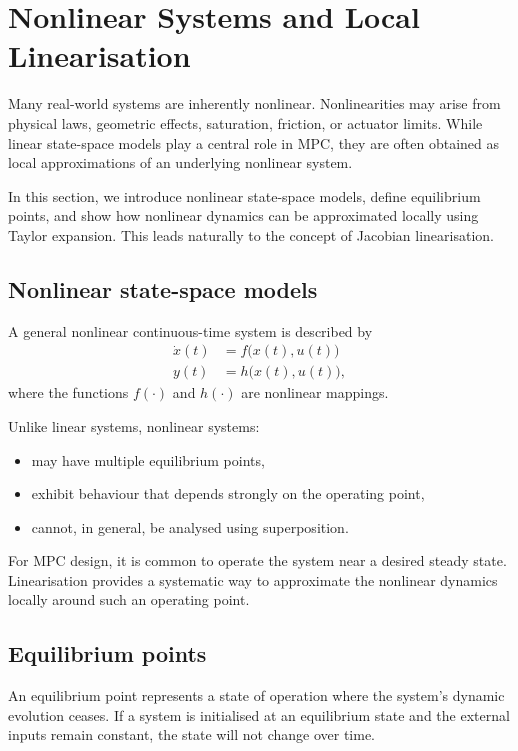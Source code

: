 \section{Nonlinear Systems and Local Linearisation}

Many real-world systems are inherently nonlinear. Nonlinearities may arise from physical laws, geometric effects, saturation, friction, or actuator limits. While linear state-space models play a central role in MPC, they are often obtained as local approximations of an underlying nonlinear system.

In this section, we introduce nonlinear state-space models, define equilibrium points, and show how nonlinear dynamics can be approximated locally using Taylor expansion. This leads naturally to the concept of Jacobian linearisation.

\subsection{Nonlinear state-space models}

A general nonlinear continuous-time system is described by
\begin{align*}
\dot{x}(t) &= f\big(x(t), u(t)\big) \\
y(t) &= h\big(x(t), u(t)\big),
\end{align*}
where the functions $f(\cdot)$ and $h(\cdot)$ are nonlinear mappings.

Unlike linear systems, nonlinear systems:
\begin{itemize}
	\item may have multiple equilibrium points,
	\item exhibit behaviour that depends strongly on the operating point,
	\item cannot, in general, be analysed using superposition.
\end{itemize}

For MPC design, it is common to operate the system near a desired steady state. Linearisation provides a systematic way to approximate the nonlinear dynamics locally around such an operating point.

\subsection{Equilibrium points}

An equilibrium point represents a state of operation where the system's dynamic evolution ceases. If a system is initialised at an equilibrium state and the external inputs remain constant, the state will not change over time.

